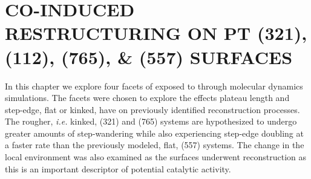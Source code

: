 \chapter{CO-INDUCED RESTRUCTURING ON PT (321), (112), (765), \& (557) SURFACES}
\label{chap:facet}



In this chapter we explore four facets of  exposed to  through
molecular dynamics simulations. The facets were chosen to explore the effects
plateau length and step-edge, flat or kinked, have on previously identified
reconstruction processes. The rougher, {\em i.e.} kinked, (321) and (765)
systems are hypothesized to undergo greater amounts of step-wandering while
also experiencing step-edge doubling at a faster rate than the previously
modeled, flat, (557) systems. The change in the local environment was also
examined as the surfaces underwent reconstruction as this is an important
descriptor of potential catalytic activity. 

